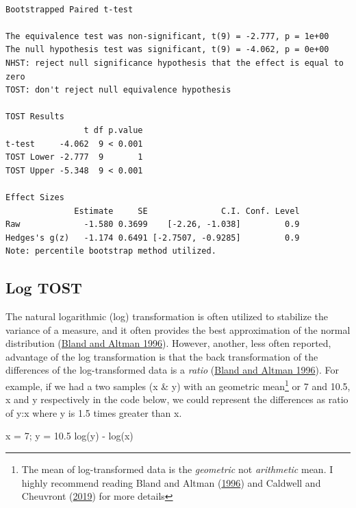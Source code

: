\documentclass[
]{interact}
\newenvironment{Shaded}{\begin{snugshade}}{\end{snugshade}}
\newcommand{\DecValTok}[1]{\textcolor[rgb]{0.68,0.00,0.00}{#1}}
\newcommand{\FloatTok}[1]{\textcolor[rgb]{0.68,0.00,0.00}{#1}}
\newcommand{\FunctionTok}[1]{\textcolor[rgb]{0.28,0.35,0.67}{#1}}
\newcommand{\NormalTok}[1]{\textcolor[rgb]{0.00,0.23,0.31}{#1}}
\newcommand{\OtherTok}[1]{\textcolor[rgb]{0.00,0.23,0.31}{#1}}
\newcommand{\SpecialCharTok}[1]{\textcolor[rgb]{0.37,0.37,0.37}{#1}}
\begin{document}
\begin{verbatim}

Bootstrapped Paired t-test

The equivalence test was non-significant, t(9) = -2.777, p = 1e+00
The null hypothesis test was significant, t(9) = -4.062, p = 0e+00
NHST: reject null significance hypothesis that the effect is equal to zero 
TOST: don't reject null equivalence hypothesis

TOST Results 
                t df p.value
t-test     -4.062  9 < 0.001
TOST Lower -2.777  9       1
TOST Upper -5.348  9 < 0.001

Effect Sizes 
              Estimate     SE               C.I. Conf. Level
Raw             -1.580 0.3699    [-2.26, -1.038]         0.9
Hedges's g(z)   -1.174 0.6491 [-2.7507, -0.9285]         0.9
Note: percentile bootstrap method utilized.
\end{verbatim}

\newpage

\hypertarget{log-tost}{%
\subsection{Log TOST}\label{log-tost}}

The natural logarithmic (log) transformation is often utilized to
stabilize the variance of a measure, and it often provides the best
approximation of the normal distribution
(\protect\hyperlink{ref-logtest}{Bland and Altman 1996}). However,
another, less often reported, advantage of the log transformation is
that the back transformation of the differences of the log-transformed
data is a \emph{ratio} (\protect\hyperlink{ref-logtest}{Bland and Altman
1996}). For example, if we had a two samples (x \& y) with an geometric
mean\footnote{The mean of log-transformed data is the \emph{geometric}
  not \emph{arithmetic} mean. I highly recommend reading Bland and
  Altman (\protect\hyperlink{ref-logtest}{1996}) and Caldwell and
  Cheuvront (\protect\hyperlink{ref-caldwell2019basic}{2019}) for more
  details} or 7 and 10.5, x and y respectively in the code below, we
could represent the differences as ratio of y:x where y is 1.5 times
greater than x.

\begin{Shaded}
\begin{Highlighting}[]
\NormalTok{x }\OtherTok{=} \DecValTok{7}\NormalTok{; y }\OtherTok{=} \FloatTok{10.5}
\FunctionTok{log}\NormalTok{(y) }\SpecialCharTok{{-}} \FunctionTok{log}\NormalTok{(x)}
\end{Highlighting}
\end{Shaded}
\end{document}
